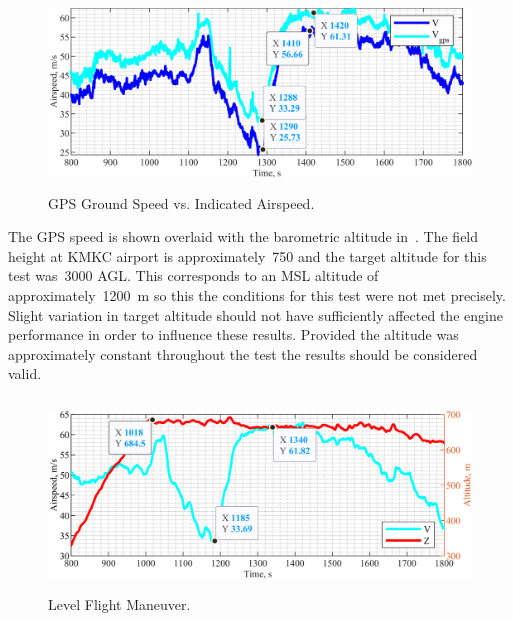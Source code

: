 \documentclass[conf]{new-aiaa}
\begin{document}
\begin{figure}[htp!]
\centering
	\includegraphics[height=2in]{GPSSpeedComparison.png}
	\caption{GPS Ground Speed vs. Indicated Airspeed.}
	\label{gpsspeedcomparison}
\end{figure}

The GPS speed is shown overlaid with the barometric altitude in~. The field height at KMKC airport is approximately~\SI{750}{\foot} and the target altitude for this test was~\SI{3000}{\foot} AGL. This corresponds to an MSL altitude of approximately~\SI{1200}{\meter} so this the conditions for this test were not met precisely. Slight variation in target altitude should not have sufficiently affected the engine performance in order to influence these results. Provided the altitude was approximately constant throughout the test the results should be considered valid.

\begin{figure}[htp!]
\centering
	\includegraphics[height=2in]{LevelFlightPower.png}
	\caption{Level Flight Maneuver.}
	\label{levelflightmaneuver}
\end{figure}
\end{document}
